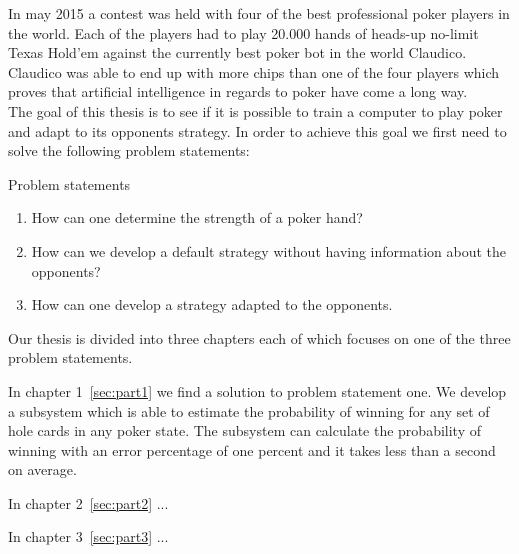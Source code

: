 

In may 2015 a contest was held with four of the best professional poker players in the world. Each of the players had to play 20.000 hands of heads-up no-limit Texas Hold'em against the currently best poker bot in the world Claudico. Claudico was able to end up with more chips than one of the four players which proves that artificial intelligence in regards to poker have come a long way.\\

The goal of this thesis is to see if it is possible to train a computer to play poker and adapt to its opponents strategy. In order to achieve this goal we first need to solve the following problem statements:


\vspace{4mm}
\begin{statementBox2}{Problem statements}
\begin{enumerate}
    \item \label{itm:q1} How can one determine the strength of a poker hand? \label{itm:ps1}
    \item \label{itm:q2} How can we develop a default strategy without having information about the opponents? \label{itm:ps2}
    \item \label{itm:q3} How can one develop a strategy adapted to the opponents. \label{itm:ps3}
  \end{enumerate}
\end{statementBox2}
\vspace{4mm}

Our thesis is divided into three chapters each of which focuses on one of the three problem statements.

In chapter 1~\ref{sec:part1} we find a solution to problem statement one. We develop a subsystem which is able to estimate the probability of winning for any set of hole cards in any poker state. The subsystem can calculate the probability of winning with an error percentage of one percent and it takes less than a second on average.

In chapter 2~\ref{sec:part2} ...

In chapter 3~\ref{sec:part3} ...
